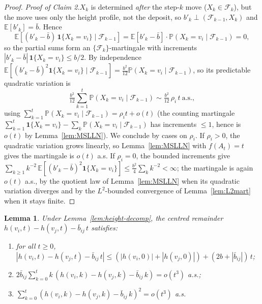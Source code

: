 \documentclass[11pt]{article}
\newtheorem{lem}{Lemma}
\theoremstyle{definition}
\begin{document}
\begin{proof}
\medskip\noindent\textit{Proof of Claim 2.}\quad $X_k$ is determined \emph{after} the step-$k$ move ($X_k \in \mathcal{F}_k$), but the move uses only the height profile, not the deposit, so $b'_k \perp (\mathcal{F}_{k-1}, X_k)$ and $\mathbb{E}[b'_k] = \bar b$. Hence
\[
\mathbb{E}[(b'_k - \bar b)\,\mathbf{1}\{X_k = v_i\}\mid\mathcal{F}_{k-1}] = \mathbb{E}[b'_k - \bar b]\cdot\mathbb{P}(X_k = v_i\mid\mathcal{F}_{k-1}) = 0,
\]
so the partial sums form an $\{\mathcal{F}_k\}$-martingale with increments $|b'_k - \bar b|\,\mathbf{1}\{X_k = v_i\} \le b/2$. By independence $\mathbb{E}[(b'_k - \bar b)^2 \mathbf{1}\{X_k = v_i\}\mid\mathcal{F}_{k-1}] = \tfrac{b^2}{12}\mathbb{P}(X_k = v_i\mid\mathcal{F}_{k-1})$, so its predictable quadratic variation is
\[
\tfrac{b^2}{12}\sum_{k=1}^{t}\mathbb{P}(X_k = v_i\mid\mathcal{F}_{k-1}) \sim \tfrac{b^2}{12}\,\rho_i\,t \ \text{a.s.},
\]
using $\sum_{k=1}^{t}\mathbb{P}(X_k{=}v_i\mid\mathcal{F}_{k-1}) = \rho_i t + o(t)$ (the counting martingale $\sum_{k=1}^{t}\mathbf{1}\{X_k=v_i\} - \sum_k\mathbb{P}(X_k{=}v_i\mid\mathcal{F}_{k-1})$ has increments $\le 1$, hence is $o(t)$ by Lemma~\ref{lem:MSLLN}). We conclude by cases on $\rho_i$. If $\rho_i > 0$, the quadratic variation grows linearly, so Lemma~\ref{lem:MSLLN} with $f(A_t) = t$ gives the martingale is $o(t)$ a.s. If $\rho_i = 0$, the bounded increments give $\sum_{k\ge1} k^{-2}\,\mathbb{E}[(b'_k - \bar b)^2 \mathbf{1}\{X_k = v_i\}] \le \tfrac{b^2}{4}\sum_k k^{-2} < \infty$; the martingale is again $o(t)$ a.s., by the quotient law of Lemma~\ref{lem:MSLLN} when its quadratic variation diverges and by the $L^2$-bounded convergence of Lemma~\ref{lem:L2mart} when it stays finite.
\end{proof}




\begin{lem}
\label{lem:remainder-est}
Under Lemma~\ref{lem:height-decomp}, the centred remainder $h(v_i,t) - h(v_j,t) - \bar{b}_{ij}\,t$ satisfies:
\begin{enumerate}[label=\textup{(\Roman*)}]
\item for all $t \geq 0$, $|h(v_i,t) - h(v_j,t) - \bar{b}_{ij}\,t| \leq (|h(v_i, 0)| + |h(v_j, 0)|) + (2b + |\bar{b}_{ij}|)\,t$;
\item $2\bar{b}_{ij}\sum_{k=0}^{t} k\,(h(v_i,k) - h(v_j,k) - \bar{b}_{ij}\,k) = o(t^3)$ a.s.;
\item $\sum_{k=0}^{t} (h(v_i,k) - h(v_j,k) - \bar{b}_{ij}\,k)^2 = o(t^3)$ a.s.
\end{enumerate}
\end{lem}
\end{document}
